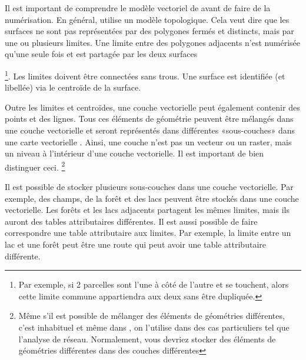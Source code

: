 Il est important de comprendre le modèle vectoriel de \grass avant de faire de la numérisation. En général, \grass utilise un modèle topologique. Cela veut dire que les surfaces ne sont pas représentées par des polygones fermés et distincts, mais par une ou plusieurs limites. Une limite entre des polygones adjacents n'est numérisée qu'une seule fois et est partagée par les deux surfaces{\footnote{Par exemple, si 2 parcelles sont l'une à côté de l'autre et se touchent, alors cette limite commune appartiendra aux deux sans être dupliquée.}. Les limites doivent être connectées sans trous. Une surface est identifiée (et libellée) via le centroïde de la surface.

Outre les limites et centroïdes, une couche vectorielle peut également contenir des points et des lignes. Tous ces éléments de géométrie peuvent être mélangés dans une couche vectorielle et seront représentés dans différentes «sous-couches» dans une carte vectorielle \grass. Ainsi, une couche \grass n'est pas un vecteur ou un raster, mais un niveau à l'intérieur d'une couche vectorielle. Il est important de bien distinguer ceci.
\footnote{Même s'il est possible de mélanger des éléments de géométries différentes, c'est inhabituel et même dans \grass, on l'utilise dans des cas particuliers tel que l'analyse de réseau. Normalement, vous devriez stocker des éléments de géométries différentes dans des couches différentes}

Il est possible de stocker plusieurs sous-couches dans une couche vectorielle. Par exemple, des champs, de la forêt et des lacs peuvent être stockés dans une couche vectorielle. Les forêts et les lacs adjacents partagent les mêmes limites, mais ils auront des tables attributaires différentes. Il est aussi possible de faire correspondre une table attributaire aux limites. Par exemple, la limite entre un lac et une forêt peut être une route qui peut avoir une table attributaire différente.

}
